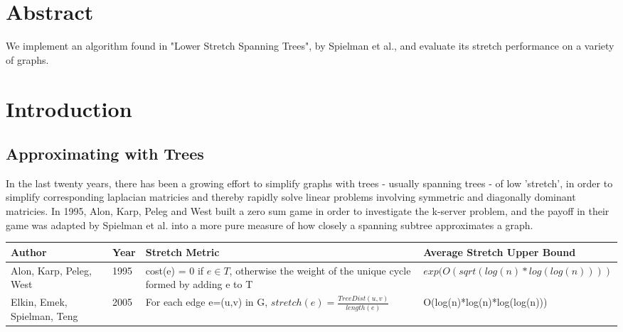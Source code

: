 \documentclass{article}
\title{\cTitle}
\author{\cAuthor}
\begin{document}
\maketitle

\section*{Abstract}
We implement an algorithm found in "Lower Stretch Spanning Trees", by Spielman et al., and evaluate its stretch performance on a variety of graphs.
\section*{Introduction}
\subsection*{Approximating with Trees}
In the last twenty years, there has been a growing effort to simplify graphs with trees - usually spanning trees - of low 'stretch', in order to simplify corresponding laplacian matricies and thereby rapidly solve linear problems involving symmetric and diagonally dominant matricies.
In 1995, Alon, Karp, Peleg and West\cite{AKPG} built a zero sum game in order to investigate the k-server problem\cite{k-server}, and the payoff in their game was adapted by Spielman et al.\cite{lower-stretch} into a more pure measure of how closely a spanning subtree approximates a graph.

\begin{table}
    \begin{tabular}{|p{3cm}|l|p{5cm}|l|}
    \hline
    Author                      &         Year &                Stretch Metric                                                                              & Average Stretch Upper Bound                             \\ \hline
    Alon, Karp, Peleg, West     & 1995 &           cost(e) = 0 if $e \in T$, otherwise the weight of the unique cycle formed by adding e to T  &                         $exp(O(sqrt(log(n)*log(log(n))))$ \\ \hline
    Elkin, Emek, Spielman, Teng & 2005 & For each edge e=(u,v) in G, $stretch(e) = \frac{TreeDist(u,v)}{length(e)}$                            & O(log(n)*log(n)*log(log(n)))                            \\ \hline
    \end{tabular}
\end{table}
\end{document}
